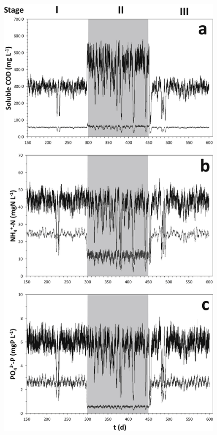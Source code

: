 \begin{figure}[tp]
    \centering
    \includegraphics[width=1\linewidth,height=\textheight,keepaspectratio]{./Chap2/simulations/dynamic_output.jpg}
    \caption{}
    \label{fig:ch2_dyn_sol}
\end{figure}

